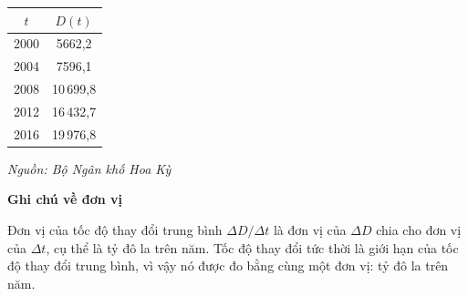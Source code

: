 
\vspace{6mm}

\begin{minipage}[t]{44mm}
  \centering
  \renewcommand{\arraystretch}{1.25}
  \setlength{\tabcolsep}{10pt}
  \begin{tabular}{|c|c|}
    \hline
    \rowcolor{tableheader}
    \rule{0pt}{2.4ex}$t$ & $D(t)$ \\
    \hline
    2000 & \phantom{0}5662{,}2 \\
    2004 & \phantom{0}7596{,}1 \\
    2008 & 10\,699{,}8 \\
    2012 & 16\,432{,}7 \\
    2016 & 19\,976{,}8 \\
    \hline
  \end{tabular}

  \vspace{3pt}
  {\fontsize{7.5pt}{9pt}\selectfont\color{darkgraytext}\textit{Nguồn: Bộ Ngân khố Hoa Kỳ}\par}

  \vspace{6.2cm}

  \raggedright
  {\fontsize{9pt}{11pt}\selectfont\textbf{\textsf{Ghi chú về đơn vị}}\par}
  \vspace{3pt}
  {\fontsize{8.5pt}{11pt}\selectfont
  Đơn vị của tốc độ thay đổi trung bình $\Delta D/\Delta t$ là đơn vị của $\Delta D$ chia cho đơn vị của $\Delta t$, cụ thể là tỷ đô la trên năm. Tốc độ thay đổi tức thời là giới hạn của tốc độ thay đổi trung bình, vì vậy nó được đo bằng cùng một đơn vị: tỷ đô la trên năm.\par}
\end{minipage}%
\hfill
